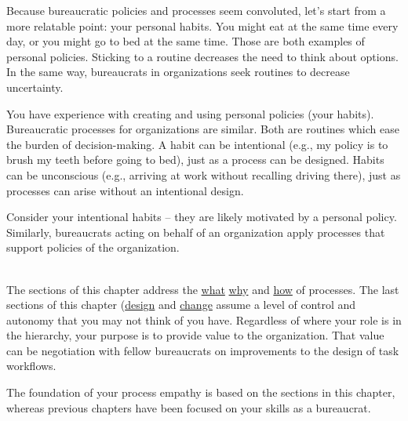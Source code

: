 
Because bureaucratic policies and processes seem convoluted, let's start from a more relatable point: your personal habits.
You might eat at the same time every day, or you might go to bed at the same time. Those are both examples of personal policies. Sticking to a routine decreases the need to think about options. In the same way, bureaucrats in organizations seek routines to decrease uncertainty. 

You have experience with creating and using personal policies (your habits).  Bureaucratic processes for organizations are similar.
Both are routines which ease the burden of decision-making. A habit can be intentional (e.g., my policy is to brush my teeth before going to bed), just as a process can be designed. Habits can be unconscious (e.g., arriving at work without recalling driving there), just as processes can arise without an intentional design. 

Consider your intentional habits -- they are likely motivated by a personal policy. Similarly, bureaucrats acting on behalf of an organization apply processes that support policies of the organization.

\ \\

The sections of this chapter address 
the \hyperref[sec:definition-of-process]{what}\iftoggle{haspagenumbers}{(page~\pageref{sec:definition-of-process}), }{,}
\hyperref[sec:why-processes-exist]{why}\iftoggle{haspagenumbers}{(page~\pageref{sec:why-processes-exist}), }{,}
and 
\hyperref[sec:process-chaos]{how} \iftoggle{haspagenumbers}{(page~\pageref{sec:process-chaos}) }{}
of processes. 
The last sections of this chapter 
(\hyperref[sec:design-of-processes]{design} \iftoggle{haspagenumbers}{ on page~\pageref{sec:design-of-processes} }{}
and 
\hyperref[sec:change-a-process]{change}\iftoggle{haspagenumbers}{ on page~\pageref{sec:change-a-process})}{)} 
assume a level of control and autonomy that you may not think of you have. Regardless of where your role is in the hierarchy, your purpose is to provide value to the organization. That value can be negotiation with fellow bureaucrats on improvements to the design of task workflows. 

The foundation of your \gls{process empathy} is based on the sections in this chapter, whereas previous chapters have been focused on your skills as a bureaucrat. 